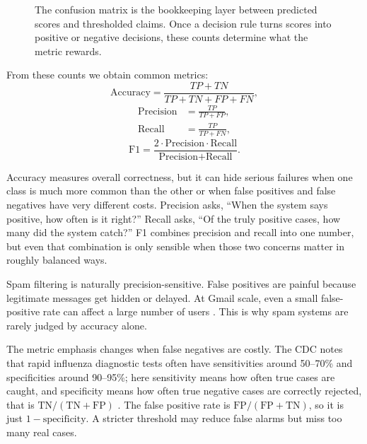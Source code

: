 \begin{figure}[t]
{%
}
\caption{The confusion matrix is the bookkeeping layer between predicted scores and thresholded claims. Once a decision rule turns scores into positive or negative decisions, these counts determine what the metric rewards.}
\label{fig:confusion-matrix}
\end{figure}

From these counts we obtain common metrics:
\[
\text{Accuracy} = \frac{TP + TN}{TP + TN + FP + FN},
\]
\begin{align*}
\text{Precision} &= \frac{TP}{TP + FP}, \\[4pt]
\text{Recall} &= \frac{TP}{TP + FN},
\end{align*}
\[
\text{F1} = \frac{2 \cdot \text{Precision}\cdot \text{Recall}}
{\text{Precision} + \text{Recall}}.
\]

Accuracy measures overall correctness, but it can hide serious failures when one class is much more common than the other or when false positives and false negatives have very different costs. Precision asks, ``When the system says positive, how often is it right?'' Recall asks, ``Of the truly positive cases, how many did the system catch?'' F1 combines precision and recall into one number, but even that combination is only sensible when those two concerns matter in roughly balanced ways.

\begin{example}
Spam filtering is naturally precision-sensitive. False positives are painful because legitimate messages get hidden or delayed. At Gmail scale, even a small false-positive rate can affect a large number of users \citep{gmail2023}. This is why spam systems are rarely judged by accuracy alone.
\end{example}

\begin{example}
The metric emphasis changes when false negatives are costly. The CDC notes that rapid influenza diagnostic tests often have sensitivities around 50--70\% and specificities around 90--95\%; here sensitivity means how often true cases are caught, and specificity means how often true negative cases are correctly rejected, that is $\mathrm{TN}/(\mathrm{TN}+\mathrm{FP})$ \citep{cdc_ridt}. The false positive rate is $\mathrm{FP}/(\mathrm{FP}+\mathrm{TN})$, so it is just $1-\text{specificity}$. A stricter threshold may reduce false alarms but miss too many real cases.
\end{example}

